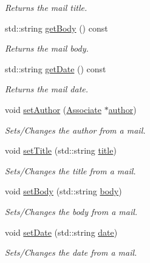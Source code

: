 \begin{DoxyCompactItemize}
\begin{DoxyCompactList}\small\item\em Returns the mail title. \end{DoxyCompactList}\item 
std\+::string \mbox{\hyperlink{classMail_af89b1b3d0f3c9d92a272c06f18fbdec3}{get\+Body}} () const
\begin{DoxyCompactList}\small\item\em Returns the mail body. \end{DoxyCompactList}\item 
std\+::string \mbox{\hyperlink{classMail_ac45841e601864ec3f84566c3ee77de9a}{get\+Date}} () const
\begin{DoxyCompactList}\small\item\em Returns the mail date. \end{DoxyCompactList}\item 
void \mbox{\hyperlink{classMail_acec00cbed8830746de97efeca4561dd8}{set\+Author}} (\mbox{\hyperlink{classAssociate}{Associate}} $\ast$\mbox{\hyperlink{classMail_acfe110a866f8cc54120d4f4ab0f8321b}{author}})
\begin{DoxyCompactList}\small\item\em Sets/\+Changes the author from a mail. \end{DoxyCompactList}\item 
void \mbox{\hyperlink{classMail_aa57f6b5a2f81ded349476984c361275b}{set\+Title}} (std\+::string \mbox{\hyperlink{classMail_a2f54f71a529dec6345d84ae60562b207}{title}})
\begin{DoxyCompactList}\small\item\em Sets/\+Changes the title from a mail. \end{DoxyCompactList}\item 
void \mbox{\hyperlink{classMail_a85ddf08af27648cc0835d66bd6b08dde}{set\+Body}} (std\+::string \mbox{\hyperlink{classMail_aaa91a94ee92b2712218a9cae389554f7}{body}})
\begin{DoxyCompactList}\small\item\em Sets/\+Changes the body from a mail. \end{DoxyCompactList}\item 
void \mbox{\hyperlink{classMail_ac5c8d190278b895b2de786be431b0a30}{set\+Date}} (std\+::string \mbox{\hyperlink{classMail_aee9bc87682f6173b92bf135397f38162}{date}})
\begin{DoxyCompactList}\small\item\em Sets/\+Changes the date from a mail. \end{DoxyCompactList}\end{DoxyCompactItemize}
